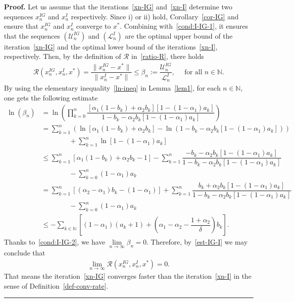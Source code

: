 \documentclass[a4paper, 11pt]{article}
\newenvironment{proof}[1][Proof]{\textbf{#1.} }{\hfill\rule{0.5em}{0.5em}}
\begin{document}
\begin{proof}
Let us assume that the iterations~\eqref{xn-IG} and~\eqref{xn-I} determine two sequences $x_n^{IG}$ and $x_n^{I}$ respectively. Since i) or ii) hold, Corollary~\ref{cor-IG} and \cite[Theorem 4.1]{paper2} ensure that $x_n^{IG}$ and $x_n^{I}$ converge to $x^*$. Combining with~\eqref{cond:I-IG-1}, it ensures that the sequences $\left(\mathcal{U}^{IG}_n\right)$ and $\left(\mathcal{L}^I_n\right)$ are the optimal upper bound of the iteration~\eqref{xn-IG} and the optimal lower bound of the iterations~\eqref{xn-I}, respectively. Then, by the definition of $\mathcal{R}$ in~\eqref{ratio-R}, there holds  
\begin{align}\label{est-IG-I}
\mathcal{R}(x_n^{IG},x_n^{I},x^*) =	\displaystyle\dfrac{\|x_n^{IG}-x^*\|}{\|x_n^{I}-x^*\|} \le \beta_n :=\displaystyle\dfrac{\mathcal{U}_n^{IG}}{\mathcal{L}_n^{I}}, \quad \mbox{ for all } n \in \mathbb{N}.
\end{align}
By using the elementary inequality~\eqref{ln-ineq} in Lemma~\ref{lem1}, for each $n \in \mathbb{N}$, one gets the following estimate
\begin{align*}
	\ln(\beta_n) &=\ln\left(\displaystyle\prod_{k=0}^n {\dfrac{[\alpha_1(1-b_k)+\alpha_2b_k][1-(1-\alpha_1)a_k]}{1-b_k-\alpha_2b_k[1-(1-\alpha_1)a_k]}}\right) \\
	&=\displaystyle\sum_{k=1}^{n}\left(\ln[\alpha_1(1-b_k)+\alpha_2b_k]-\ln\left(1-b_k-\alpha_2b_k[1-(1-\alpha_1)a_k]\right)\right) \\
	& \qquad \qquad +\displaystyle\sum_{k=1}^{n}\ln\left[1-(1-\alpha_1)a_k\right]\\
	&\le \displaystyle\sum_{k=1}^{n}[\alpha_1(1-b_k)+\alpha_2b_k-1]-\displaystyle\sum_{k=1}^{n}{\displaystyle\dfrac{-b_k-\alpha_2b_k[1-(1-\alpha_1)a_k]}{1-b_k-\alpha_2b_k[1-(1-\alpha_1)a_k]}} \\
	& \qquad \qquad -\displaystyle\sum_{k=0}^{n}{(1-\alpha_1)a_k} \\
	&=\displaystyle\sum_{k=1}^{n}[(\alpha_2-\alpha_1)b_k-(1-\alpha_1)]+\displaystyle\sum_{k=1}^{n}{\displaystyle\dfrac{b_k+\alpha_2b_k[1-(1-\alpha_1)a_k]}{1-b_k-\alpha_2b_k[1-(1-\alpha_1)a_k]}} \\ 
	& \qquad \qquad -\displaystyle\sum_{k=0}^{n}{(1-\alpha_1)a_k} \\
	&\le - \displaystyle\sum_{k \in \mathbb{N}}{\left[(1-\alpha_1)(a_k+1)+\left(\alpha_1-\alpha_2-\displaystyle\dfrac{1+\alpha_2}{\delta}\right)b_k\right]}. 
\end{align*}
Thanks to~\eqref{cond:I-IG-2}, we have $\lim\limits_{n\to\infty}{\beta_n}=0$. Therefore, by~\eqref{est-IG-I} we may conclude that
\begin{align*}
\lim\limits_{n\to\infty} \mathcal{R}(x_n^{IG},x_n^{I},x^*) = 0.
\end{align*}
That means the iteration~\eqref{xn-IG} converges faster than the iteration~\eqref{xn-I} in the sense of Definition~\ref{def-conv-rate}.
\end{proof}
\end{document}
